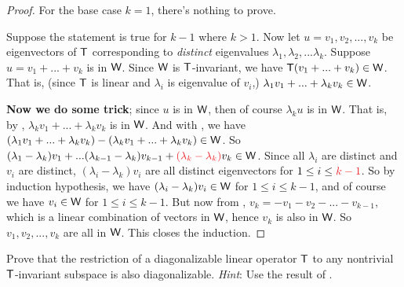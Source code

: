 \begin{proof}
For the base case \(k = 1\), there's nothing to prove.

Suppose the statement is true for \(k - 1\) where \(k > 1\).
Now let \(u = v_1, v_2, ..., v_k\) be eigenvectors of \(\textsf{T}\) corresponding to \emph{distinct} eigenvalues \(\lambda_1, \lambda_2, ... \lambda_k\).
Suppose \(u = v_1 + ... + v_k\) is in \(\textsf{W}\). 
Since \(\textsf{W}\) is \(\textsf{T}\)-invariant, we have \(\textsf{T}(v_1 + ... + v_k) \in \textsf{W}\).
That is, (since \(\textsf{T}\) is linear and \(\lambda_i\) is eigenvalue of \(v_i\),) \(\lambda_1 v_1 + ... + \lambda_k v_k \in \textsf{W}\). 

\textbf{Now we do some trick};
since \(u\) is in \(\textsf{W}\), then of course \(\lambda_k u\) is in \(\textsf{W}\).
That is, by , \(\lambda_k v_1 + ... + \lambda_k v_k\) is in \(\textsf{W}\).
And with , we have \((\lambda_1 v_1 + ... + \lambda_k v_k) - (\lambda_k v_1 + ... + \lambda_k v_k) \in \textsf{W}\).
So \((\lambda_1 - \lambda_k) v_1 + ... (\lambda_{k - 1} - \lambda_k) v_{k - 1} + \RED{(\lambda_k - \lambda_k)} v_k \in \W\).
Since all \(\lambda_i\) are distinct and \(v_i\) are distinct, \((\lambda_i - \lambda_k) v_i\) are all distinct eigenvectors for \(1 \le i \le \RED{k - 1}\).
So by induction hypothesis, we have \((\lambda_i - \lambda_k) v_i \in \textsf{W}\) for \(1 \le i \le k - 1\), and of course we have \(v_i \in \textsf{W}\) for \(1 \le i \le k - 1\).
But now from , \(v_k = -v_1 - v_2 - ... - v_{k - 1}\), which is a linear combination of vectors in \(\textsf{W}\), hence \(v_k\) is also in \(\textsf{W}\).
So \(v_1, v_2, ..., v_k\) are all in \(\textsf{W}\).
This closes the induction.
\end{proof}

\begin{exercise} \label{exercise 5.4.24}
Prove that the restriction of a diagonalizable linear operator \(\textsf{T}\) to any nontrivial \(\textsf{T}\)-invariant subspace is also diagonalizable.
\emph{Hint}: Use the result of .
\end{exercise}

